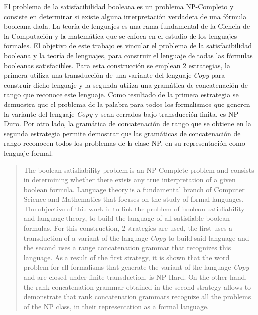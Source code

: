 \begin{resumen}
	El problema de la satisfacibilidad booleana es un problema NP-Completo y consiste en determinar si existe
	alguna interpretación verdadera de una fórmula booleana dada. La teoría de lenguajes es una rama fundamental de la Ciencia de la Computación y la matemática que se enfoca 
	en el estudio de los lenguajes formales. El objetivo de este trabajo es vincular el problema de la satisfacibilidad
	booleana y la teoría de lenguajes, para construir el lenguaje de todas las fórmulas booleanas satisfacibles.
	Para esta construcción se emplean 2 estrategias, la primera utiliza una transducción de una variante del lenguaje
	\textit{Copy} para construir dicho lenguaje y la segunda utiliza una gramática de concatenación de rango 
	que reconoce este lenguaje. Como resultado de la primera estrategia se demuestra que el problema de la palabra 
	para todos los formalismos
	que generen la variante del lenguaje \textit{Copy} y sean cerrados bajo transducción finita, es NP-Duro.
	Por otro lado, la gramática de concatenación de rango que se obtiene en la segunda estrategia permite 
	demostrar que las gramáticas de concatenación de rango reconocen todos los problemas de la clase NP, en 
	su representación como lenguaje formal.
\end{resumen}

\begin{abstract}
	The boolean satisfiability problem is an NP-Complete problem and consists in determining whether there exists
	any true interpretation of a given boolean formula. Language theory is a fundamental branch of Computer Science and Mathematics that focuses
	on the study of formal languages. The objective of this work is to link the problem of boolean
	satisfiability and language theory, to build the language of all satisfiable boolean formulas.
	For this construction, 2 strategies are used, the first uses a transduction of a variant of the language
	\textit{Copy} to build said language and the second uses a range concatenation grammar
	that recognizes this language. As a result of the first strategy, it is shown that the word problem
	for all formalisms
	that generate the variant of the language \textit{Copy} and are closed under finite transduction, is NP-Hard.
	On the other hand, the rank concatenation grammar obtained in the second strategy allows
	to demonstrate that rank concatenation grammars recognize all the problems of the NP class, in
	their representation as a formal language.
\end{abstract}